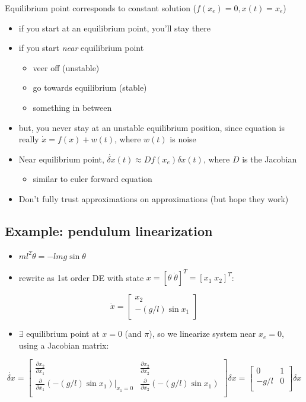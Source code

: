 \documentclass[10pt,letterpaper]{article}
\begin{document}
Equilibrium point corresponds to constant solution ($f(x_e)= 0, x(t)=x_e$)
\begin{itemize}
\item if you start at an equilibrium point, you'll stay there
\item if you start \emph{near} equilibrium point

\begin{itemize}
\item veer off (unstable)
\item go towards equilibrium (stable)
\item something in between
\end{itemize}

\item but, you never stay at an unstable equilibrium position, since equation is really $\dot x = f(x) + w(t)$, where $w(t)$ is noise
\item Near equilibrium point, $\dot{\delta x}(t) \approx Df(x_e) \delta x(t)$, where $D$ is the Jacobian

\begin{itemize}
\item similar to euler forward equation
\end{itemize}

\item Don't fully trust approximations on approximations (but hope they work)
\end{itemize}
\subsection{Example: pendulum linearization}
\label{sec-8_7}

\begin{itemize}
\item $ml ^{2} \ddot{\theta}=-lmg \sin \theta$
\item rewrite as 1st order DE with state $x=[\theta \; \dot \theta] ^{T} = [x_1 \; x_2] ^{T}$:
\end{itemize}
$$
\dot x =
\begin{bmatrix}
  x _{2}          \\
  -(g/l) \sin x_1 \\
\end{bmatrix}
$$ 
\begin{itemize}
\item $\exists$ equilibrium point at $x=0$ (and $\pi$), so we linearize system near $x _{e} =0$, using a Jacobian matrix:
\end{itemize}
$$
\dot{\delta x}=
\begin{bmatrix}
  \frac{\partial x_2}{\partial x_1}               & \frac{\partial x_2}{\partial x_2}               \\
  \frac{\partial}{\partial x_1} \left(-(g/l) \sin x_1 \right)|_{x_1=0} & \frac{\partial}{\partial x_2} (-(g/l) \sin x_1) \\
\end{bmatrix}
\delta x  
=
\begin{bmatrix}
     0 & 1 \\
  -g/l & 0 \\
\end{bmatrix}
\delta x  
$$
\end{document}
